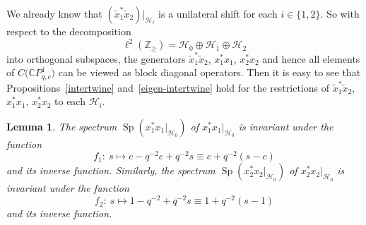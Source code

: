 \documentclass[11pt]{article}
\numberwithin{equation}{section}
\newtheorem{lemma}{Lemma}
\begin{document}
We already know that $( \tilde{x}_{1}^{\ast}\tilde{x}_{2})
|_{\mathcal{H}_{i}}$ is a unilateral shift for each $i\in\{ 1,2\}
$. So with respect to the decomposition
\[
\ell^{2}( \mathbb{Z}_{\geq}) =\mathcal{H}_{0}\oplus
\mathcal{H}_{1}\oplus\mathcal{H}_{2}%
\]
into orthogonal subspaces, the generators $\tilde{x}_{1}^{\ast}\tilde{x}_{2}$,
$x_{1}^{\ast}x_{1}$, $x_{2}^{\ast}x_{2}$ and hence all elements of $C\big(
\mathbb{C}P_{q,c}^{1}\big) $ can be viewed as block diagonal operators.
Then it is easy to see that Propositions~\ref{intertwine} and~\ref{eigen-intertwine} hold for the
restrictions of $\tilde{x}_{1}^{\ast}\tilde{x}_{2}$, $x_{1}^{\ast}x_{1}$,
$x_{2}^{\ast}x_{2}$ to each $\mathcal{H}_{i}$.

\begin{lemma}\label{invariant-spectrum} The spectrum $\operatorname{Sp}( x_{1}^{\ast}%
x_{1}|_{\mathcal{H}_{0}}) $ of $x_{1}^{\ast}x_{1}|_{\mathcal{H}_{0}}$
is invariant under the function
\[
f_{1}\colon \ s\mapsto c-q^{-2}c+q^{-2}s\equiv c+q^{-2}(s-c)
\]
and its inverse function. Similarly, the spectrum $\operatorname{Sp}(
x_{2}^{\ast}x_{2}|_{\mathcal{H}_{0}}) $ of $x_{2}^{\ast}x_{2}%
|_{\mathcal{H}_{0}}$ is invariant under the function%
\[
f_{2}\colon \ s\mapsto1-q^{-2}+q^{-2}s\equiv1+q^{-2}(s-1)
\]
and its inverse function.
\end{lemma}
\end{document}

